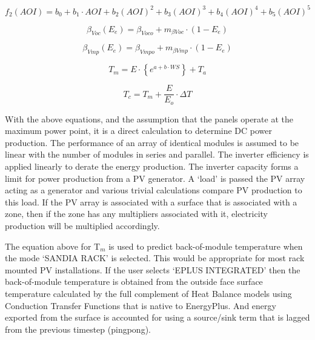 \begin{equation}
{f_2}\left( {AOI} \right) = {b_0} + {b_1} \cdot AOI + {b_2}{\left( {AOI} \right)^2} + {b_3}{\left( {AOI} \right)^3} + {b_4}{\left( {AOI} \right)^4} + {b_5}{\left( {AOI} \right)^5}
\end{equation}

\begin{equation}
{\beta_{Voc}}({E_e}) = {\beta_{Voco}} + {m_{\beta Voc}} \cdot (1 - {E_e})
\end{equation}

\begin{equation}
{\beta_{Vmp}}({E_e}) = {\beta_{Vmpo}} + {m_{\beta Vmp}} \cdot (1 - {E_e})
\end{equation}

\begin{equation}
{T_m} = E \cdot \left\{ {{e^{a + b \cdot WS}}} \right\} + {T_a}
\end{equation}

\begin{equation}
{T_c} = {T_m} + \frac{E}{{{E_o}}} \cdot \Delta T
\end{equation}

With the above equations, and the assumption that the panels operate at the maximum power point, it is a direct calculation to determine DC power production. The performance of an array of identical modules is assumed to be linear with the number of modules in series and parallel. The inverter efficiency is applied linearly to derate the energy production. The inverter capacity forms a limit for power production from a PV generator. A `load' is passed the PV array acting as a generator and various trivial calculations compare PV production to this load. If the PV array is associated with a surface that is associated with a zone, then if the zone has any multipliers associated with it, electricity production will be multiplied accordingly.

The equation above for T\(_{m}\) is used to predict back-of-module temperature when the mode `SANDIA RACK' is selected. This would be appropriate for most rack mounted PV installations. If the user selects `EPLUS INTEGRATED' then the back-of-module temperature is obtained from the outside face surface temperature calculated by the full complement of Heat Balance models using Conduction Transfer Functions that is native to EnergyPlus. And energy exported from the surface is accounted for using a source/sink term that is lagged from the previous timestep (pingpong).

